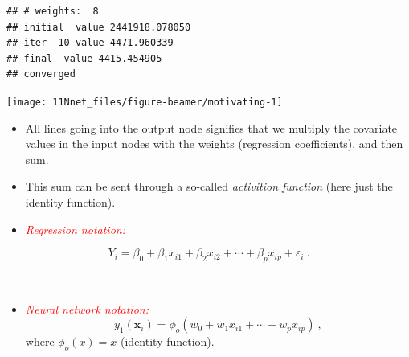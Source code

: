 \documentclass[10pt,ignorenonframetext,]{beamer}
\providecommand{\tightlist}{%
  \setlength{\itemsep}{0pt}\setlength{\parskip}{0pt}}
\begin{document}
\begin{frame}[fragile]

\vspace{-20mm}

\scriptsize

\begin{verbatim}
## # weights:  8
## initial  value 2441918.078050 
## iter  10 value 4471.960339
## final  value 4415.454905 
## converged
\end{verbatim}

\begin{center}\texttt{[image: 11Nnet\_files/figure-beamer/motivating-1]} \end{center}

\normalsize

\begin{itemize}
\tightlist
\item
  All lines going into the output node signifies that we multiply the
  covariate values in the input nodes with the weights (regression
  coefficients), and then sum.
\item
  This sum can be sent through a so-called \emph{activition function}
  (here just the identity function).
\end{itemize}

\end{frame}

\begin{frame}

\begin{itemize}
\tightlist
\item
  \emph{\textcolor{red}{Regression notation:}}
\end{itemize}

\begin{equation*}
 Y_i=\beta_0 + \beta_1 x_{i1}+\beta_2 x_{i2}+\cdots + \beta_p x_{ip}+\varepsilon_i \ .
\end{equation*}

\(~\)

\begin{itemize}
\tightlist
\item
  \emph{\textcolor{red}{Neural network notation:}} \begin{equation*}
  y_1({\boldsymbol x}_i)=\phi_o(w_0+w_1 x_{i1}+\cdots + w_p x_{ip}) \ ,
  \end{equation*} where \(\phi_o(x)=x\) (identity function).
\end{itemize}

\end{frame}
\end{document}
